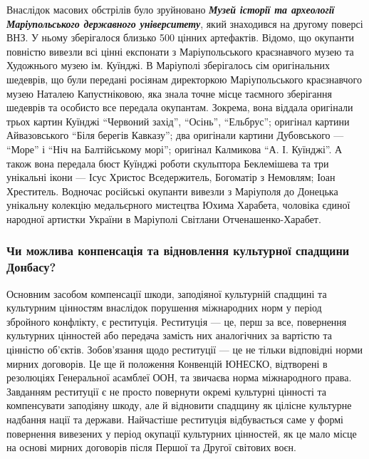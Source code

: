 
Внаслідок масових обстрілів було зруйновано \emph{\textbf{Музей історії та археології
Маріупольського державного університету}}, який знаходився на другому поверсі
ВНЗ. У ньому зберігалося близько 500 цінних артефактів. Відомо, що окупанти
повністю вивезли всі цінні експонати з Маріупольського краєзнавчого музею та
Художнього музею ім. Куїнджі. В Маріуполі зберігалось сім оригінальних
шедеврів, що були передані росіянам директоркою Маріупольського краєзнавчого
музею Наталею Капустніковою, яка знала точне місце таємного зберігання шедеврів
та особисто все передала окупантам. Зокрема, вона віддала оригінали трьох
картин Куїнджі \enquote{Червоний захід}, \enquote{Осінь}, \enquote{Ельбрус}; оригінал картини
Айвазовського \enquote{Біля берегів Кавказу}; два оригінали картини Дубовського —
\enquote{Море} і \enquote{Ніч на Балтійському морі}; оригінал Калмикова \enquote{А. І. Куїнджі}. А також
вона передала бюст Куїнджі роботи скульптора Беклемішева та три унікальні ікони
— Ісус Христос Вседержитель, Богоматір з Немовлям; Іоан Хреститель. Водночас
російські окупанти вивезли з Маріуполя до Донецька унікальну колекцію
медальєрного мистецтва Юхима Харабета, чоловіка єдиної народної артистки
України в Маріуполі Світлани Отченашенко-Харабет.

\subsubsection{Чи можлива конпенсація та відновлення культурної спадщини Донбасу?}

Основним засобом компенсації шкоди, заподіяної культурній спадщині та
культурним цінностям внаслідок порушення міжнародних норм у період збройного
конфлікту, є реституція. Реституція — це, перш за все, повернення культурних
цінностей або передача замість них аналогічних за вартістю та цінністю
об'єктів. Зобов'язання щодо реституції — це не тільки відповідні норми мирних
договорів. Це ще й положення Конвенцій ЮНЕСКО, відтворені в резолюціях
Генеральної асамблеї ООН, та звичаєва норма міжнародного права. Завданням
реституції є не просто повернути окремі культурні цінності та компенсувати
заподіяну шкоду, але й відновити спадщину як цілісне культурне надбання нації
та держави. Найчастіше реституція відбувається саме у формі повернення
вивезених у період окупації культурних цінностей, як це мало місце на основі
мирних договорів після Першої та Другої світових воєн.

